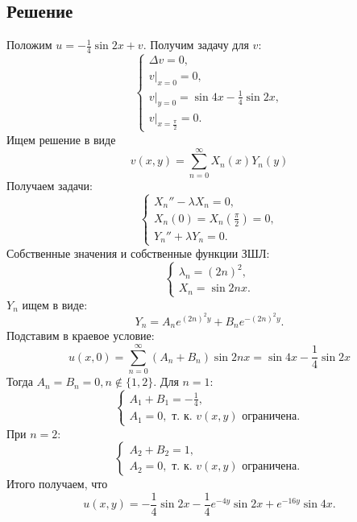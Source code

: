 \documentclass[11pt]{article}
\begin{document}
\subsection{Решение}
\label{sec:org7e5d1a2}
 Положим $u = -\frac14\sin2x + v$. Получим задачу для $v$:
 \begin{equation*}
 \begin{cases}
 \Delta v = 0, \\
 v|_{x = 0} = 0, \\
 v|_{y = 0} = \sin4x - \frac14\sin2x, \\
 v|_{x = \frac{\pi}2} = 0.
 \end{cases}
 \end{equation*}
 Ищем решение в виде
 \begin{equation*}
 v(x, y) = \sum_{n = 0}^{\infty}X_n(x)Y_n(y)
 \end{equation*}
 Получаем задачи:
 \begin{equation*}
 \begin{cases}
 X_n'' - \lambda X_n = 0, \\
 X_n(0) = X_n\left(\frac{\pi}2\right) = 0, \\
 Y_n'' + \lambda Y_n = 0.
 \end{cases}
 \end{equation*}
 Собственные значения и собственные функции ЗШЛ:
 \begin{equation*}
 \begin{cases}
 \lambda_n = (2n)^2, \\
 X_n = \sin2nx.
 \end{cases}
 \end{equation*}
$Y_n$ ищем в виде:
\begin{equation*}
Y_n = A_ne^{(2n)^2y} + B_ne^{-(2n)^2y}.
\end{equation*}
Подставим в краевое условие:
\begin{equation*}
u(x, 0) = \sum_{n = 0}^{\infty}(A_n + B_n)\sin2nx = \sin4x - \frac14\sin2x
\end{equation*}
Тогда $A_n = B_n = 0, n \notin \{1, 2\}$. Для $n = 1$:
\begin{equation*}
\begin{cases}
A_1 + B_1 = -\frac14, \\
A_1 = 0, \text{ т. к. } v(x, y) \text{ ограничена.}
\end{cases}
\end{equation*}
При $n = 2$:
\begin{equation*}
\begin{cases}
A_2 + B_2 = 1, \\
A_2 = 0, \text{ т. к. } v(x, y) \text{ ограничена.}
\end{cases}
\end{equation*}
Итого получаем, что
\begin{equation}
u(x, y) = -\frac14\sin2x - \frac14e^{-4y}\sin2x + e^{-16y}\sin4x.
\end{equation}
\end{document}
